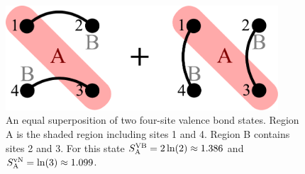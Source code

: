 \begin{figure}
\centering
\includegraphics[width=4in]{./figures/made/example1.pdf}
\caption[A superposition of two four-site valence bond states]{An equal superposition of two four-site valence bond states.  
Region A is the shaded region including sites 1 and 4.
Region B contains sites 2 and 3.
For this state $S^{\text{VB}}_{\rm A}=2\ln(2)\approx1.386$ and $S^{\text{vN}}_{\rm A}=\ln(3)\approx 1.099$.
 \label{example1}
}
\end{figure}

